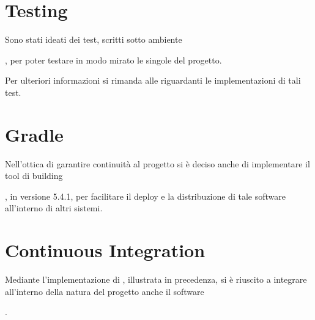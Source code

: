 \documentclass[letterpaper,10pt,italian,openany,oneside]{sphinxmanual}
\begin{document}
\section{Testing}
\label{\detokenize{introduzione:testing}}
Sono stati ideati dei test, scritti sotto ambiente  %
\begin{footnote}[6]\sphinxAtStartFootnote
{}
%
\end{footnote}, per poter testare in modo mirato le singole  del progetto.

Per ulteriori informazioni si rimanda alle {\hyperref[\detokenize{test/packages::doc}]{}}  riguardanti le implementazioni di tali test.


\section{Gradle}
\label{\detokenize{introduzione:gradle}}
Nell’ottica di garantire continuità al progetto si è deciso anche di implementare il tool di building  %
\begin{footnote}[7]\sphinxAtStartFootnote
{}
%
\end{footnote}, in versione 5.4.1,
per facilitare il deploy e la distribuzione di tale software all’interno di altri sistemi.


\section{Continuous Integration}
\label{\detokenize{introduzione:continuous-integration}}\begin{quote}

\end{quote}

Mediante l’implementazione di , illustrata in precedenza, si è riuscito a integrare all’interno della natura del progetto
anche il software  %
\begin{footnote}[8]\sphinxAtStartFootnote
{}
%
\end{footnote}.
\end{document}
